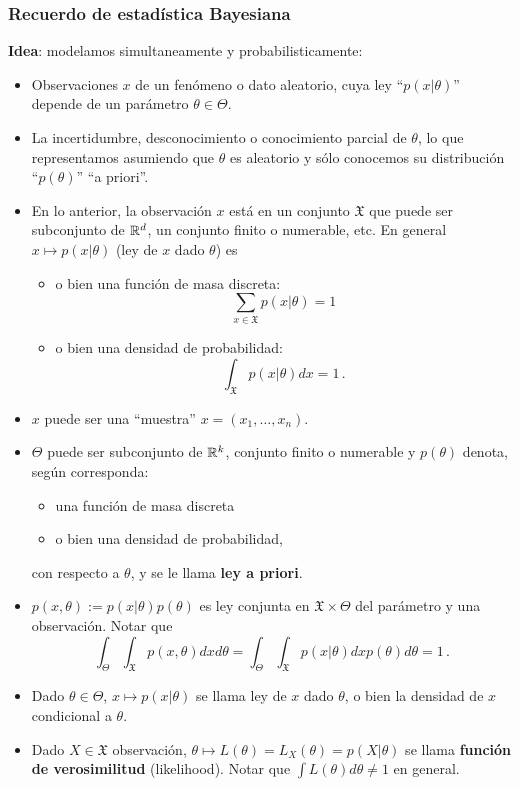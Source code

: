 \subsubsection{Recuerdo de estadística Bayesiana}
\textbf{Idea}: modelamos simultaneamente y probabilisticamente:
\begin{itemize}
    \item Observaciones $x$ de un fenómeno o dato aleatorio, cuya ley ``$p(x|\theta)$'' depende de un parámetro $\theta\in\Theta$.
    \item La incertidumbre, desconocimiento o conocimiento parcial de $\theta$, lo que representamos asumiendo que $\theta$ es aleatorio y sólo conocemos su distribución ``$p(\theta)$'' ``a priori''.
    \item En lo anterior, la observación $x$ está en un conjunto $\mathfrak{X}$ que puede ser subconjunto de $\mathbb{R}^d$, un conjunto finito o numerable, etc. 
    \newline En general $x\mapsto p(x|\theta)$ (ley de $x$ dado $\theta$) es
    \begin{itemize}
        \item o bien una función de masa discreta: 
        $$\displaystyle\sum_{x\in \mathfrak{X}}p(x|\theta)=1$$
        \item o bien una densidad de probabilidad: 
        $$\displaystyle\int_{\mathfrak{X}}p(x|\theta)dx=1\,.$$
    \end{itemize}
    \item $x$ puede ser una ``muestra'' $x=(x_1,\dots,x_n)$.
    \item $\Theta$ puede ser subconjunto de $\mathbb{R}^k$, conjunto finito o numerable y $p(\theta)$ denota, seg\'un corresponda:
    \begin{itemize}
        \item una función de masa discreta
        \item o bien una densidad de probabilidad,
    \end{itemize}
    con respecto a $\theta$,  y se le llama \textbf{ley a priori}.
    \item $p(x,\theta):=p(x|\theta)p(\theta)$ es ley conjunta en $\mathfrak{X}\times \Theta$ del parámetro y una observación.
    \newline Notar que
    $$ \displaystyle\int_\Theta\int_\mathfrak{X} p(x,\theta)dxd\theta=\int_\Theta\int_\mathfrak{X} p(x|\theta)dx p(\theta)d\theta=1\,.$$
    \item Dado $\theta\in\Theta$, $x\mapsto p(x|\theta)$ se llama ley de $x$ dado $\theta$, o bien la densidad de $x$ condicional a $\theta$.
    \item Dado $X\in\mathfrak{X}$ observación, $\theta\mapsto L(\theta)=L_X(\theta)=p(X|\theta)$ se llama \textbf{función de verosimilitud} (likelihood). Notar que $\int L(\theta)d\theta\neq1$ en general.
\end{itemize}
